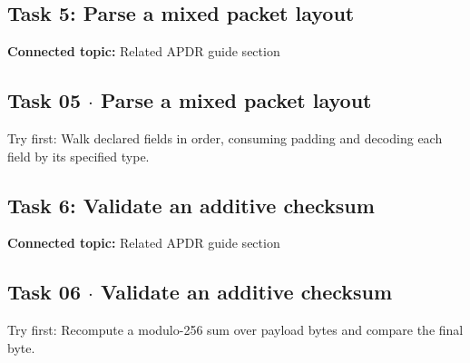 \documentclass[11pt]{article}
\begin{document}
\begin{keepsection}
\section{Task 5: Parse a mixed packet layout}

\textbf{Connected topic:} Related APDR guide section

\begin{keepsection}
\subsection{Task 05 \ensuremath{\cdot} Parse a mixed packet layout}

Try first: Walk declared fields in order, consuming padding and decoding each field by its specified type.

\end{keepsection}
\end{keepsection}

\begin{keepsection}
\section{Task 6: Validate an additive checksum}

\textbf{Connected topic:} Related APDR guide section

\begin{keepsection}
\subsection{Task 06 \ensuremath{\cdot} Validate an additive checksum}

Try first: Recompute a modulo-256 sum over payload bytes and compare the final byte.

\end{keepsection}
\end{keepsection}
\end{document}
